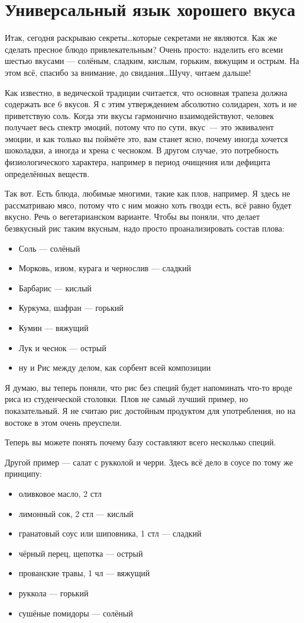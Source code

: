 \section{Универсальный язык хорошего вкуса}

Итак, сегодня раскрываю секреты\ldots которые секретами не являются.
Как же сделать пресное блюдо привлекательным? 
Очень просто: наделить его всеми шестью вкусами — солёным, сладким, кислым, горьким, вяжущим и острым. На этом всё, спасибо за внимание, до свидания\ldots Шучу, читаем дальше!

Как известно, в ведической традиции считается, что основная трапеза должна содержать все 6 вкусов. Я с этим утверждением абсолютно солидарен, хоть и не приветствую соль. Когда эти вкусы гармонично взаимодействуют, человек получает весь спектр эмоций, потому что по сути, вкус~--- это эквивалент эмоции, и как только вы поймёте это, вам станет ясно, почему иногда хочется шоколадки, а иногда и хрена с чесноком. В другом случае, это потребность физиологического характера, например в период очищения или дефицита определённых веществ.

Так вот. Есть блюда, любимые многими, такие как плов, например. Я здесь не рассматриваю мясо, потому что с ним можно хоть гвозди есть, всё равно будет вкусно. Речь о вегетарианском варианте. Чтобы вы поняли, что делает безвкусный рис таким вкусным, надо просто проанализировать состав плова:
\begin{itemize}
\item Соль — солёный
\item Морковь, изюм, курага и чернослив — сладкий
\item Барбарис — кислый
\item Куркума, шафран — горький
\item Кумин — вяжущий
\item Лук и чеснок — острый
\item ну и Рис между делом, как сорбент всей композиции
\end{itemize}

Я думаю, вы теперь поняли, что рис без специй будет напоминать что-то вроде риса из студенческой столовки. Плов не самый лучший пример, но показательный. Я не считаю рис достойным продуктом для употребления, но на востоке в этом очень преуспели.

Теперь вы можете понять почему базу составляют всего несколько специй.

Другой пример — салат с рукколой и черри. Здесь всё дело в соусе по тому же принципу:
\begin{itemize}
\item оливковое масло, 2 стл
\item лимонный сок, 2 стл — кислый
\item гранатовый соус или шиповника, 1 стл — сладкий
\item чёрный перец, щепотка — острый
\item прованские травы, 1 чл — вяжущий
 
\item руккола — горький
\item сушёные помидоры — солёный
\end{itemize}


